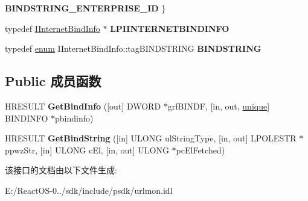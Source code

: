 \begin{DoxyCompactItemize}
{\bfseries B\+I\+N\+D\+S\+T\+R\+I\+N\+G\+\_\+\+E\+N\+T\+E\+R\+P\+R\+I\+S\+E\+\_\+\+ID}
 \}
\item 
\mbox{\label{interface_i_internet_bind_info_a1e2e105c96374a24faae2a0f70df92ff}} 
typedef \hyperlink{interface_i_internet_bind_info}{I\+Internet\+Bind\+Info} $\ast$ {\bfseries L\+P\+I\+I\+N\+T\+E\+R\+N\+E\+T\+B\+I\+N\+D\+I\+N\+FO}
\item 
\mbox{\label{interface_i_internet_bind_info_afa0561bcaf421f0ffe549d1ce3765858}} 
typedef \hyperlink{interfaceenum}{enum} I\+Internet\+Bind\+Info\+::tag\+B\+I\+N\+D\+S\+T\+R\+I\+NG {\bfseries B\+I\+N\+D\+S\+T\+R\+I\+NG}
\end{DoxyCompactItemize}
\subsection*{Public 成员函数}
\begin{DoxyCompactItemize}
\item 
\mbox{\label{interface_i_internet_bind_info_a21246c6d3a2ddb9e777f45a3c99c4143}} 
H\+R\+E\+S\+U\+LT {\bfseries Get\+Bind\+Info} (\mbox{[}out\mbox{]} D\+W\+O\+RD $\ast$grf\+B\+I\+N\+DF, \mbox{[}in, out, \hyperlink{interfaceunique}{unique}\mbox{]} B\+I\+N\+D\+I\+N\+FO $\ast$pbindinfo)
\item 
\mbox{\label{interface_i_internet_bind_info_a3279c7743b20ccff4c746c7b875eddb4}} 
H\+R\+E\+S\+U\+LT {\bfseries Get\+Bind\+String} (\mbox{[}in\mbox{]} U\+L\+O\+NG ul\+String\+Type, \mbox{[}in, out\mbox{]} L\+P\+O\+L\+E\+S\+TR $\ast$ppwz\+Str, \mbox{[}in\mbox{]} U\+L\+O\+NG c\+El, \mbox{[}in, out\mbox{]} U\+L\+O\+NG $\ast$pc\+El\+Fetched)
\end{DoxyCompactItemize}


该接口的文档由以下文件生成\+:\begin{DoxyCompactItemize}
\item 
E\+:/\+React\+O\+S-\/0../sdk/include/psdk/urlmon.\+idl\end{DoxyCompactItemize}
